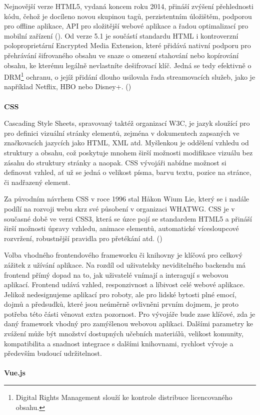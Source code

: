 \documentclass[twoside, 12pt]{article}
\begin{document}
Nejnovější verze HTML5, vydaná koncem roku 2014, přináší zvýšení přehlednosti kódu, čehož je docíleno novou skupinou tagů, perzistentním úložištěm, podporou pro offline aplikace, API pro složitější webové aplikace a řadou optimalizací pro mobilní zařízení (\cite{HTMLinfo}). Od verze 5.1 je součástí standardu HTML i kontroverzní poloproprietární Encrypted Media Extension, které přidává nativní podporu pro přehrávání šifrovaného obsahu ve snaze o omezení stahování nebo kopírování obsahu, ke kterému legálně nevlastníte dešifrovací klíč. Jedná se tedy efektivně o DRM\footnote{Digital Rights Management slouží ke kontrole distribuce licencovaného obsahu.} ochranu, o jejíž přidání dlouho usilovala řada streamovacích služeb, jako je například Netflix, HBO nebo Disney+. (\cite{HTMLdrm})
\\
\\
\textbf{CSS}

Cascading Style Sheets, spravovaný taktéž organizací W3C, je jazyk sloužící pro pro definici vizuální stránky elementů, zejména v dokumentech zapsaných ve značkovacích jazycích jako HTML, XML atd. Myšlenkou je oddělení vzhledu od struktury a obsahu, což poskytuje mnohem širší možnosti modifikace vizuálu bez zásahu do struktury stránky a naopak. CSS vývojáři nabídne možnost si definovat vzhled, ať už se jedná o velikost písma, barvu textu, pozice na stránce, či nadřazený element.

Za původním návrhem CSS v roce 1996 stal Håkon Wium Lie, který se i nadále podílí na rozvoji webu skrz své působení v organizaci WHATWG. CSS je v současné době ve verzi CSS3, která se úzce pojí se standardem HTML5 a přináší širší možnosti úpravy vzhledu, animace elementů, automatické vícesloupcové rozvržení, robustnější pravidla pro přetékání atd. (\cite{CSS3})





Volba vhodného frontendového frameworku či knihovny je klíčová pro celkový zážitek z užívání aplikace. Na rozdíl od uživatelsky neviditelného backendu má frontend přímý dopad na to, jak uživatelé vnímají a interagují s webovou aplikací. Frontend udává vzhled, responzivnost a líbivost celé webové aplikace. Jelikož nedesignujeme aplikací pro roboty, ale pro lidské bytosti plné emocí, dojmů a předsudků, které jsou neúměrně ovlivněni prvním dojmem, je proto potřeba této části věnovat extra pozornost. Pro vývojáře bude zase klíčové, zda je daný framework vhodný pro zamýšlenou webovou aplikaci. Dalšími parametry ke zvážení může být množství dostupných učebních materiálů, velikost komunity, kompatibilita a snadnost integrace s dalšími knihovnami, rychlost vývoje a především budoucí udržitelnost.
\\
\\
\textbf{Vue.js}
\end{document}
